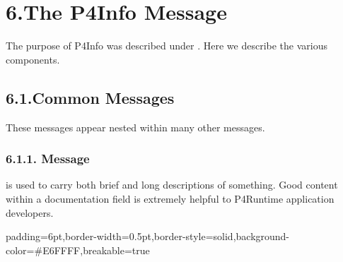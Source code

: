 \documentclass[11pt]{article}
\begin{document}
{%
\section{6.\hspace*{0.5em}The P4Info Message}\label{sec-the-p4info-message}%

\noindent{}The purpose of P4Info was described under
.
Here we describe the various
components.%

\subsection{6.1.\hspace*{0.5em}Common Messages}\label{sec-common-messages}%

\noindent{}These messages appear nested within many other messages.%

\subsubsection{6.1.1.\hspace*{0.5em} Message}\label{sec-documentation-message}%

\noindent{} is used to carry both brief and long descriptions of something.
Good content within a documentation field is extremely helpful to P4Runtime
application developers.%

\begin{mdbmargintb}{6pt}{6pt}%
\begin{mdblock}{padding=6pt,border-width=0.5pt,border-style=solid,background-color=\#E6FFFF,breakable=true}%
\begin{mdpre}%
\end{mdpre}%
\end{mdblock}%
\end{mdbmargintb}%

}
\end{document}
